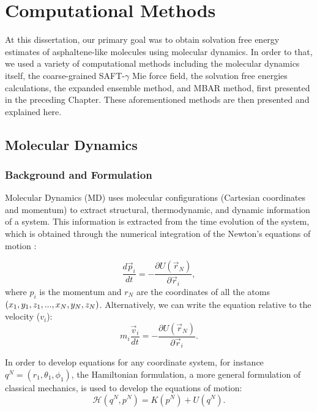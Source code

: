 
\chapter{Computational Methods} %

\label{Chapter3} %

At this dissertation, our primary goal was to obtain solvation free energy estimates of asphaltene-like molecules using molecular dynamics. In order to that, we used a variety of computational methods including the molecular dynamics itself, the coarse-grained SAFT-$\gamma$ Mie force field, the solvation free energies calculations, the expanded ensemble method, and MBAR method, first presented in the preceding Chapter. These aforementioned methods are then presented and explained here.   

\section{Molecular Dynamics}

\subsection{Background and Formulation}
Molecular Dynamics (MD) uses molecular configurations (Cartesian coordinates and momentum) to extract structural, thermodynamic, and dynamic information of a system. This information is extracted from the time evolution of the system, which is obtained  through the numerical integration of the Newton's equations of motion \cite{tuckerman}:

\begin{equation}
\frac{d \vec{p}_{i}}{dt} = - \frac{\partial U (\vec{r}_{N})}{\partial \vec{r}_{i}},
\end{equation}
where $p_{i}$ is the momentum and $r_{N}$ are the coordinates of all the atoms $(x_{1},y_{1},z_{1},..., x_{N},\\ y_{N},z_{N})$. Alternatively, we can write the equation relative to the velocity ($v_{i}$):
\begin{equation}
m_{i} \frac{\vec{v}_{i}}{dt} = - \frac{\partial U (\vec{r}_{N})}{\partial \vec{r}_{i}}.
\end{equation}

In order to develop equations for any coordinate system, for instance $q^{N}=(r_{1},\theta _{1},\phi _{1})$, the Hamiltonian formulation, a more general formulation of classical mechanics,  is used to develop the equations of motion:
\begin{equation}
\mathcal{H} (q^{N},p^{N}) = K(p^{N}) + U(q^{N}) .
\end{equation}

